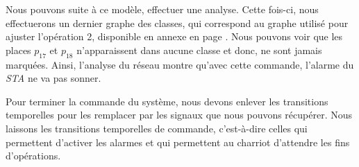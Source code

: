 Nous pouvons suite à ce modèle, effectuer une analyse. Cette fois-ci, nous effectuerons un dernier graphe des classes, qui correspond au graphe utilisé pour ajuster l'opération 2, disponible en annexe en page \pageref{Annex:GDC-miseauPointI-Ope2}. Nous pouvons voir que les places $p_{17}$ et $p_{18}$ n'apparaissent dans aucune classe et donc, ne sont jamais marquées. Ainsi, l'analyse du réseau montre qu'avec cette commande, l'alarme du \emph{STA} ne va pas sonner.


Pour terminer la commande du système, nous devons enlever les transitions temporelles pour les remplacer par les signaux que nous pouvons récupérer. Nous laissons les transitions temporelles de commande, c'est-à-dire celles qui permettent d'activer les alarmes et qui permettent au charriot d'attendre les fins d'opérations. 
